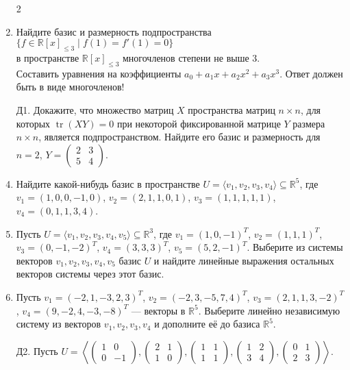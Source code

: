 \documentclass[12pt]{article}
\newcommand{\circenumi}{\renewcommand{\theenumi}{\arabic{enumi}$^\circ$}}
\newcommand{\plainenumii}{\renewcommand{\theenumii}{\arabic{enumi}.\arabic{enumii}}}
\renewcommand{\le}{\leqslant}
\DeclareMathOperator{\tr}{tr}
\newenvironment{multienum}[1]
{
\begin{enumerate}[i.] \plainenumii
\begin{multicols}{#1}
}{
\end{multicols}
\end{enumerate}
}
\begin{document}
\begin{enumerate}
\begin{multienum}{2}
\end{multienum}
\item Найдите базис и размерность подпространства $\{f \in \mathbb{R}[x]_{\le 3} \mid f(1) = f'(1) = 0\}$ \\в пространстве $\mathbb{R}[x]_{\le 3}$ многочленов степени не выше 3.\\
{\tiny Составить уравнения на коэффициенты $a_0+a_1x+a_2x^2+a_3x^3$. Ответ должен быть в виде многочленов!}
\item[Д1.] Докажите, что множество матриц $X$ пространства матриц $n\times n$, для которых $\tr(XY)=0$ при некоторой фиксированной матрице $Y$ размера $n\times n$, является подпространством. Найдите его базис и размерность для $n=2$, $Y = \begin{pmatrix} 2 & 3 \\ 5 & 4 \end{pmatrix}$. 
\item \label{choose_any_basis} Найдите какой-нибудь базис в пространстве $U = \langle v_1, v_2, v_3, v_4\rangle \subseteq \mathbb{R}^5$, где \\ 
$v_1 = (1, 0, 0, -1, 0)$, $v_2 = (2, 1, 1, 0, 1)$, $v_3=(1, 1, 1, 1, 1)$, $v_4=(0, 1, 1, 3, 4)$.
	\circenumi
\item \label{choose_basis_here} Пусть $U = \langle v_1, v_2, v_3, v_4, v_5\rangle \subseteq \mathbb{R}^3$, где $v_1 = (1, 0, -1)^T$, $v_2 = (1, 1, 1)^T$, $v_3 = (0, -1, -2)^T$, $v_4=(3, 3, 3)^T$, $v_5=(5,2,-1)^T$. Выберите из системы векторов $v_1, v_2, v_3, v_4, v_5$ базис $U$ и найдите линейные выражения остальных векторов системы через этот базис. 
\item \label{choose_add_basis2} Пусть $v_1 = (-2,1,-3,2,3)^T$, $v_2 = (-2,3,-5,7,4)^T$, $v_3 = (2,1,1,3,-2)^T$, $v_4 = (9,-2,4,-3,-8)^T$ --- векторы в $\mathbb{R}^5$. Выберите линейно независимую систему из векторов $v_1, v_2, v_3, v_4$ и дополните её до базиса $\mathbb{R}^5$. 
\item[Д2.] Пусть $U = \left\langle \begin{pmatrix}1 & 0\\0 & -1\end{pmatrix}, \begin{pmatrix}2 & 1\\1 & 0\end{pmatrix}, \begin{pmatrix}1 & 1\\1 & 1\end{pmatrix}, \begin{pmatrix}1 & 2\\3 & 4\end{pmatrix}, \begin{pmatrix}0 & 1\\2 & 3\end{pmatrix}\right\rangle$. 

\end{enumerate}
\end{document}
